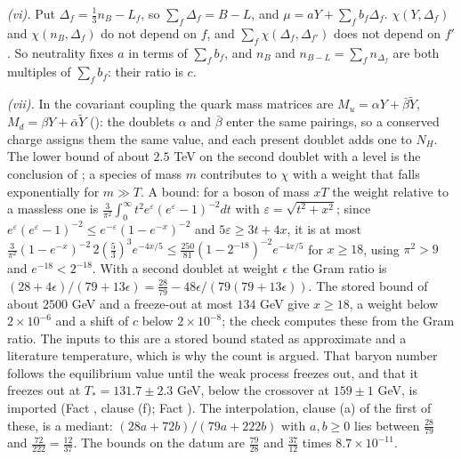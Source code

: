 \emph{(vi).} Put $\Delta_{f} = \tfrac13n_{B} - L_{f}$, so $\sum_{f}\Delta_{f} = B - L$, and $\mu = aY + \sum_{f}b_{f}\Delta_{f}$. $\chi(Y, \Delta_{f})$ and $\chi(n_{B}, \Delta_{f})$ do not depend on $f$, and $\sum_{f}\chi(\Delta_{f}, \Delta_{f'})$ does not depend on $f'$. So neutrality fixes $a$ in terms of $\sum_{f}b_{f}$, and $n_{B}$ and $n_{B-L} = \sum_{f}n_{\Delta_{f}}$ are both multiples of $\sum_{f}b_{f}$: their ratio is $c$.

\emph{(vii).} In the covariant coupling the quark mass matrices are $M_{u} = \alpha Y + \bar{\beta}\tilde{Y}$, $M_{d} = \beta Y + \bar{\alpha}\tilde{Y}$ (): the doublets $\alpha$ and $\bar{\beta}$ enter the same pairings, so a conserved charge assigns them the same value, and each present doublet adds one to $N_{H}$. The lower bound of about $2.5$ TeV on the second doublet with a level is the conclusion of ; a species of mass $m$ contributes to $\chi$ with a weight that falls exponentially for $m \gg T$. A bound: for a boson of mass $xT$ the weight relative to a massless one is $\tfrac{3}{\pi^{2}}\int_{0}^{\infty}t^{2}e^{\varepsilon}(e^{\varepsilon} - 1)^{-2}dt$ with $\varepsilon = \sqrt{t^{2} + x^{2}}$; since $e^{\varepsilon}(e^{\varepsilon} - 1)^{-2} \le e^{-\varepsilon}(1 - e^{-x})^{-2}$ and $5\varepsilon \ge 3t + 4x$, it is at most $\tfrac{3}{\pi^{2}}(1 - e^{-x})^{-2}\,2(\tfrac53)^{3}e^{-4x/5} \le \tfrac{250}{81}(1 - 2^{-18})^{-2}e^{-4x/5}$ for $x \ge 18$, using $\pi^{2} > 9$ and $e^{-18} < 2^{-18}$. With a second doublet at weight $\epsilon$ the Gram ratio is $(28 + 4\epsilon)/(79 + 13\epsilon) = \tfrac{28}{79} - 48\epsilon/(79(79 + 13\epsilon))$. The stored bound of about $2500$ GeV and a freeze-out at most $134$ GeV give $x \ge 18$, a weight below $2 \times 10^{-6}$ and a shift of $c$ below $2 \times 10^{-8}$; the check computes these from the Gram ratio. The inputs to this are a stored bound stated as approximate and a literature temperature, which is why the count is argued. That baryon number follows the equilibrium value until the weak process freezes out, and that it freezes out at $T_{*} = 131.7 \pm 2.3$ GeV, below the crossover at $159 \pm 1$ GeV, is imported (Fact , clause (f); Fact ). The interpolation, clause (a) of the first of these, is a mediant: $(28a + 72b)/(79a + 222b)$ with $a, b \ge 0$ lies between $\tfrac{28}{79}$ and $\tfrac{72}{222} = \tfrac{12}{37}$. The bounds on the datum are $\tfrac{79}{28}$ and $\tfrac{37}{12}$ times $8.7 \times 10^{-11}$.
